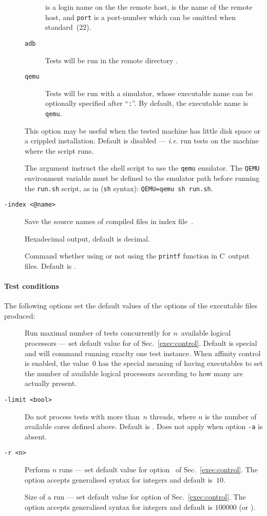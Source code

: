 \begin{description}
\begin{description}
 is a login name on the the remote host,
 is the name of the remote host,
and \texttt{port} is a port-number which can be omitted when standard~(22).
\item[\tt adb]
Tests will be run in the remote directory .
\item[\tt qemu] Tests will be run with a simulator, whose executable name
can be optionally specified after ``\texttt{:}''.
By default, the executable name is \texttt{qemu}.
\end{description}
This option may be useful when the tested machine has little disk space or a
crippled installation.
Default is disabled --- \emph{i.e.} run tests on
the machine where the  script runs.

The argument  instruct the shell script to use the \texttt{qemu}
emulator. The \texttt{QEMU} environment variable must be defined to the
emulator path before running the \texttt{run.sh} script, as in (\texttt{sh} syntax): \verb+QEMU=qemu sh run.sh+.


\item[{\tt -index <@name>}] Save the source names of compiled files in index
file~.
\item[\aname{opt:hexa}{{\tt -hexa}}] Hexadecimal output, default is decimal.
\item[\aname{opt:stdio}{{\tt -stdio (true|false)}}] Command whether
using or not using the \texttt{printf} function in C~output
files. Default is .
\end{description}

\paragraph*{Test conditions\label{litmus:option:sec}}
The following options set the default values of
the options of the executable files produced:
\begin{description}
\item[]Run maximal number of tests concurrently for $n$~available
logical processors ---
set default value for  of Sec.~\ref{exec:control}.
Default is special and will command running exaclty one test instance.
When affinity control is enabled, the value~$0$ has the special
meaning of having executables to set the
number of available logical processors according to
how many are actually present.
\item[{\tt -limit <bool>}] Do not process tests with more than~$n$
threads, where $n$ is the number of available cores defined above.
Default is .  Does not apply when option \texttt{-a} is absent.
\item[{\tt -r <n>}] Perform $n$ runs --- set default value for
option~ of Sec.~\ref{exec:control}.
The option accepts generalised syntax for integers and
default is~$10$.
\item[]Size of a run --- set default value for
option  of Sec.~\ref{exec:control}.
The option accepts generalised syntax for integers and
default is $100000$ (or ).
\end{description}


